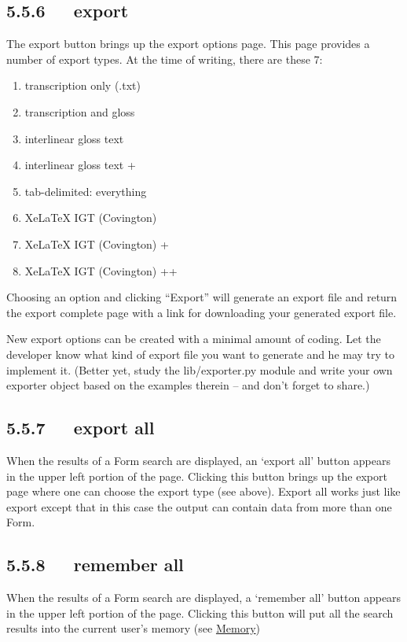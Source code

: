 \documentclass[letterpaper,10pt,english]{sphinxmanual}
\begin{document}
\subsection{5.5.6   export}
\label{user_guide:export}
The export button brings up the export options page.  This page provides a
number of export types.  At the time of writing, there are these 7:
\begin{enumerate}
\item {} 
transcription only (.txt)

\item {} 
transcription and gloss

\item {} 
interlinear gloss text

\item {} 
interlinear gloss text +

\item {} 
tab-delimited: everything

\item {} 
XeLaTeX IGT (Covington)

\item {} 
XeLaTeX IGT (Covington) +

\item {} 
XeLaTeX IGT (Covington) ++

\end{enumerate}

Choosing an option and clicking ``Export'' will generate an export file and return
the export complete page with a link for downloading your generated export file.

New export options can be created with a minimal amount of coding.  Let the
developer know what kind of export file you want to generate and he may try to
implement it.  (Better yet, study the lib/exporter.py module and write your
own exporter object based on the examples therein -- and don't forget to share.)


\subsection{5.5.7   export all}
\label{user_guide:export-all}
When the results of a Form search are displayed, an `export all' button appears
in the upper left portion of the page.  Clicking this button brings up the
export page where one can choose the export type (see above).  Export all works
just like export except that in this case the output can contain data from more
than one Form.


\subsection{5.5.8   remember all}
\label{user_guide:remember-all}
When the results of a Form search are displayed, a `remember all' button appears
in the upper left portion of the page.  Clicking this button will put all the
search results into the current user's memory (see {\hyperref[user_guide:memory]{Memory}})
\end{document}

